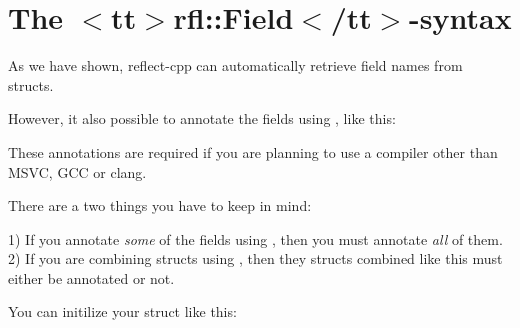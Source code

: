 \chapter{The \texorpdfstring{$<$}{<}tt\texorpdfstring{$>$}{>}rfl\+::Field\texorpdfstring{$<$}{<}/tt\texorpdfstring{$>$}{>}-\/syntax}
\hypertarget{md_external_2reflect-cpp_2docs_2concepts_2field__syntax}{}\label{md_external_2reflect-cpp_2docs_2concepts_2field__syntax}
\label{md_external_2reflect-cpp_2docs_2concepts_2field__syntax_autotoc_md536}%
%


As we have shown, reflect-\/cpp can automatically retrieve field names from structs.

However, it also possible to annotate the fields using {\ttfamily {}}, like this\+:


\begin{DoxyCode}{0}
\DoxyCodeLine{\};}

\end{DoxyCode}


These annotations are required if you are planning to use a compiler other than MSVC, GCC or clang.

There are a two things you have to keep in mind\+:

1) If you annotate {\itshape some} of the fields using {\ttfamily {}}, then you must annotate {\itshape all} of them. 2) If you are combining structs using {\ttfamily {}}, then they structs combined like this must either be annotated or not.

You can initilize your struct like this\+:


\begin{DoxyCode}{0}

\end{DoxyCode}


